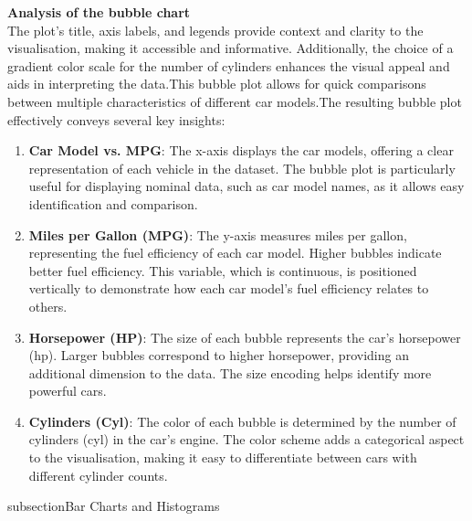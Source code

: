 \documentclass{article}\usepackage[]{graphicx}\usepackage[]{xcolor}
\begin{document}
\textbf{Analysis of the bubble chart}\\
The plot's title, axis labels, and legends provide context and clarity to the visualisation, making it accessible and informative. Additionally, the choice of a gradient color scale for the number of cylinders enhances the visual appeal and aids in interpreting the data.This bubble plot allows for quick comparisons between multiple characteristics of different car models.The resulting bubble plot effectively conveys several key insights:
\begin{enumerate}
\item \textbf{Car Model vs. MPG}: The x-axis displays the car models, offering a clear representation of each vehicle in the dataset. The bubble plot is particularly useful for displaying nominal data, such as car model names, as it allows easy identification and comparison.
\item \textbf{Miles per Gallon (MPG)}: The y-axis measures miles per gallon, representing the fuel efficiency of each car model. Higher bubbles indicate better fuel efficiency. This variable, which is continuous, is positioned vertically to demonstrate how each car model's fuel efficiency relates to others.
\item \textbf{Horsepower (HP)}: The size of each bubble represents the car's horsepower (hp). Larger bubbles correspond to higher horsepower, providing an additional dimension to the data. The size encoding helps identify more powerful cars.
\item \textbf{Cylinders (Cyl)}: The color of each bubble is determined by the number of cylinders (cyl) in the car's engine. The color scheme adds a categorical aspect to the visualisation, making it easy to differentiate between cars with different cylinder counts.
\end{enumerate}


subsection{Bar Charts and Histograms}
\end{document}
